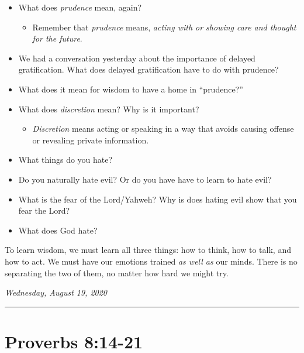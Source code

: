 \documentclass[
]{book}
\providecommand{\tightlist}{%
  \setlength{\itemsep}{0pt}\setlength{\parskip}{0pt}}
\begin{document}
\begin{itemize}
\tightlist
\item
  What does \emph{prudence} mean, again?

  \begin{itemize}
  \tightlist
  \item
    Remember that \emph{prudence} means, \emph{acting with or showing care and thought for the future}.
  \end{itemize}
\item
  We had a conversation yesterday about the importance of delayed gratification. What does delayed gratification have to do with prudence?
\item
  What does it mean for wisdom to have a home in ``prudence?''
\item
  What does \emph{discretion} mean? Why is it important?

  \begin{itemize}
  \tightlist
  \item
    \emph{Discretion} means acting or speaking in a way that avoids causing offense or revealing private information.
  \end{itemize}
\item
  What things do you hate?
\item
  Do you naturally hate evil? Or do you have have to learn to hate evil?
\item
  What is the fear of the Lord/Yahweh? Why is does hating evil show that you fear the Lord?
\item
  What does God hate?
\end{itemize}

To learn wisdom, we must learn all three things: how to think, how to talk, and how to act. We must have our emotions trained \emph{as well as} our minds. There is no separating the two of them, no matter how hard we might try.

\emph{Wednesday, August 19, 2020}

\begin{center}\rule{0.5\linewidth}{0.5pt}\end{center}

\hypertarget{proverbs-814-21}{%
\section{Proverbs 8:14-21}\label{proverbs-814-21}}
\end{document}
